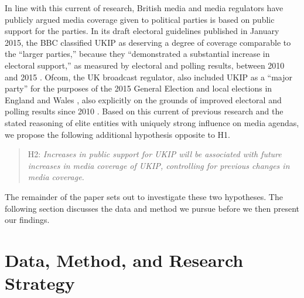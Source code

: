 \documentclass[12pt,]{article}
\begin{document}
In line with this current of research, British media and media
regulators have publicly argued media coverage given to political
parties is based on public support for the parties. In its draft
electoral guidelines published in January 2015, the BBC classified UKIP
as deserving a degree of coverage comparable to the ``larger parties,''
because they ``demonstrated a substantial increase in electoral
support,'' as measured by electoral and polling results, between 2010
and 2015 \citep{Sweeney:wp, BBC:R6UMvIKM}. Ofcom, the UK broadcast
regulator, also included UKIP as a ``major party'' for the purposes of
the 2015 General Election and local elections in England and Wales
\citep{Ofcom:2015tt}, also explicitly on the grounds of improved
electoral and polling results since 2010 \citep{Wintour:vf}. Based on
this current of previous research and the stated reasoning of elite
entities with uniquely strong influence on media agendas, we propose the
following additional hypothesis opposite to H1.

\begin{quote}
H2: \emph{Increases in public support for UKIP will be associated with
future increases in media coverage of UKIP, controlling for previous
changes in media coverage.}
\end{quote}

The remainder of the paper sets out to investigate these two hypotheses.
The following section discusses the data and method we pursue before we
then present our findings.

\section{Data, Method, and Research
Strategy}\label{data-method-and-research-strategy}
\end{document}
